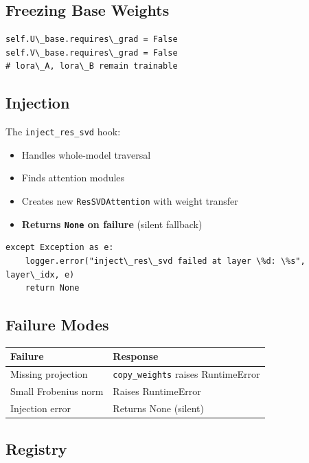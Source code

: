 \subsection{Freezing Base Weights}

\begin{lstlisting}
self.U\_base.requires\_grad = False
self.V\_base.requires\_grad = False
# lora\_A, lora\_B remain trainable
\end{lstlisting}

\subsection{Injection}

The \texttt{inject\_res\_svd} hook:
\begin{itemize}
\item Handles whole-model traversal
\item Finds attention modules
\item Creates new \texttt{ResSVDAttention} with weight transfer
\item \textbf{Returns \texttt{None} on failure} (silent fallback)

\end{itemize}
\begin{lstlisting}
except Exception as e:
    logger.error("inject\_res\_svd failed at layer \%d: \%s", layer\_idx, e)
    return None
\end{lstlisting}

\subsection{Failure Modes}

\begin{table}[H]
\centering
\small
\begin{tabular}{ll}
\toprule
\textbf{Failure} & \textbf{Response} \\
\midrule
Missing projection & \texttt{copy\_weights} raises RuntimeError \\
Small Frobenius norm & Raises RuntimeError \\
Injection error & Returns None (silent) \\
\bottomrule
\end{tabular}
\end{table}

\subsection{Registry}

